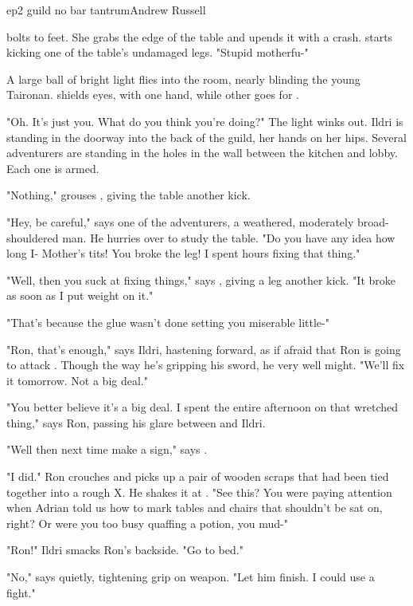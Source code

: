 \documentclass{book}
\begin{document}
\begin{childnode}{ep2 guild no bar tantrum}{Andrew Russell}

    \name{} bolts to \hisher{} feet. She grabs the edge of the table and upends it with a crash. \HeShe{} starts kicking one of the table's undamaged legs. "Stupid motherfu-"

    A large ball of bright light flies into the room, nearly blinding the young Taironan. \HeShe{} shields \hisher{} eyes, with one hand, while \hisher{} other goes for \hisher{} \weapon{}.

    "Oh. It's just you. What do you think you're doing?" The light winks out.
    Ildri is standing in the doorway into the back of the guild, her hands on her hips. Several adventurers are standing in the holes in the wall between the kitchen and lobby. Each one is armed.

    "Nothing," grouses \name{}, giving the table another kick.

    "Hey, be careful," says one of the adventurers, a weathered, moderately broad-shouldered man. He hurries over to study the table. "Do you have any idea how long I- Mother's tits! You broke the leg! I spent hours fixing that thing."

    "Well, then you suck at fixing things," says \name{}, giving a leg another kick. "It broke as soon as I put weight on it."

    "That's because the glue wasn't done setting you miserable little-"

    "Ron, that's enough," says Ildri, hastening forward, as if afraid that Ron is going to attack \name{}. Though the way he's gripping his sword, he very well might. "We'll fix it tomorrow. Not a big deal."

    "You better believe it's a big deal. I spent the entire afternoon on that wretched thing," says Ron, passing his glare between \name{} and Ildri. 

    "Well then next time make a sign," says \name{}.

    "I did." Ron crouches and picks up a pair of wooden scraps that had been tied together into a rough X. He shakes it at \name{}. "See this? You were paying attention when Adrian told us how to mark tables and chairs that shouldn't be sat on, right? Or were
    you too busy quaffing a potion, you mud-"

    "Ron!" Ildri smacks Ron's backside. "Go to bed."

    "No," says \name{} quietly, tightening \hisher{} grip on \hisher{} weapon. "Let him finish. I could use a fight."


\end{childnode}
\end{document}
